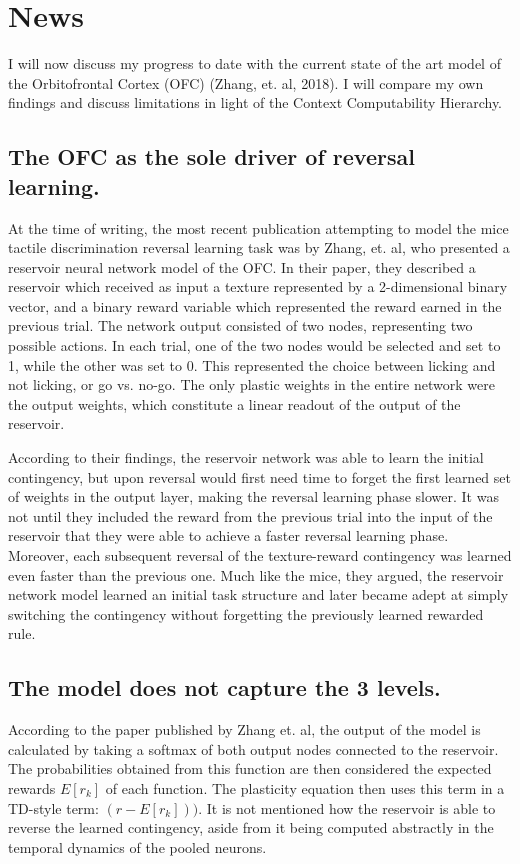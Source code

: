 \documentclass[]{article}
\begin{document}
\section{News}
I will now discuss my progress to date with the current state of the art model of the Orbitofrontal Cortex (OFC) (Zhang, et. al, 2018).  I will compare my own findings and discuss limitations in light of the Context Computability Hierarchy.

\subsection{The OFC as the sole driver of reversal learning.}
At the time of writing, the most recent publication attempting to model the mice tactile discrimination reversal learning task was by Zhang, et. al, who presented a reservoir neural network model of the OFC.  In their paper, they described a reservoir which received as input a texture represented by a 2-dimensional binary vector, and a binary reward variable which represented the reward earned in the previous trial.  The network output consisted of two nodes, representing two possible actions.  In each trial, one of the two nodes would be selected and set to 1, while the other was set to 0.  This represented the choice between licking and not licking, or go vs. no-go.  The only plastic weights in the entire network were the output weights, which constitute a linear readout of the output of the reservoir.

According to their findings, the reservoir network was able to learn the initial contingency, but upon reversal would first need time to forget the first learned set of weights in the output layer, making the reversal learning phase slower.  It was not until they included the reward from the previous trial into the input of the reservoir that they were able to achieve a faster reversal learning phase.  Moreover, each subsequent reversal of the texture-reward contingency was learned even faster than the previous one.  Much like the mice, they argued, the reservoir network model learned an initial task structure and later became adept at simply switching the contingency without forgetting the previously learned rewarded rule.

\subsection{The model does not capture the 3 levels.}
According to the paper published by Zhang et. al, the output of the model is calculated by taking a softmax of both output nodes connected to the reservoir.  The probabilities obtained from this function are then considered the expected rewards $E[r_k]$ of each function.  The plasticity equation  then uses this term in a TD-style term: $(r - E[r_k]))$.  It is not mentioned how the reservoir is able to reverse the learned contingency, aside from it being computed abstractly in the temporal dynamics of the pooled neurons.
\end{document}
